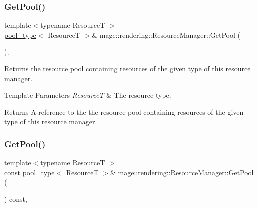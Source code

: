 \subsubsection{\texorpdfstring{Get\+Pool()}{GetPool()}\hspace{0.1cm}{\footnotesize\ttfamily [1/2]}}
{\footnotesize\ttfamily template$<$typename ResourceT $>$ \\
\hyperlink{classmage_1_1rendering_1_1_resource_manager_ab21a4e280087032ee533f267bd9bf602}{pool\+\_\+type}$<$ ResourceT $>$\& mage\+::rendering\+::\+Resource\+Manager\+::\+Get\+Pool (\begin{DoxyParamCaption}{ }\end{DoxyParamCaption})\hspace{0.3cm}{\ttfamily [private]}, {\ttfamily [noexcept]}}

Returns the resource pool containing resources of the given type of this resource manager.


\begin{DoxyTemplParams}{Template Parameters}
{\em ResourceT} & The resource type. \\
\hline
\end{DoxyTemplParams}
\begin{DoxyReturn}{Returns}
A reference to the the resource pool containing resources of the given type of this resource manager. 
\end{DoxyReturn}
\hypertarget{classmage_1_1rendering_1_1_resource_manager_a5cba7eab859779a7cb74d5f2cef21173}{}\label{classmage_1_1rendering_1_1_resource_manager_a5cba7eab859779a7cb74d5f2cef21173} 
\subsubsection{\texorpdfstring{Get\+Pool()}{GetPool()}\hspace{0.1cm}{\footnotesize\ttfamily [2/2]}}
{\footnotesize\ttfamily template$<$typename ResourceT $>$ \\
const \hyperlink{classmage_1_1rendering_1_1_resource_manager_ab21a4e280087032ee533f267bd9bf602}{pool\+\_\+type}$<$ ResourceT $>$\& mage\+::rendering\+::\+Resource\+Manager\+::\+Get\+Pool (\begin{DoxyParamCaption}{ }\end{DoxyParamCaption}) const\hspace{0.3cm}{\ttfamily [private]}, {\ttfamily [noexcept]}}

